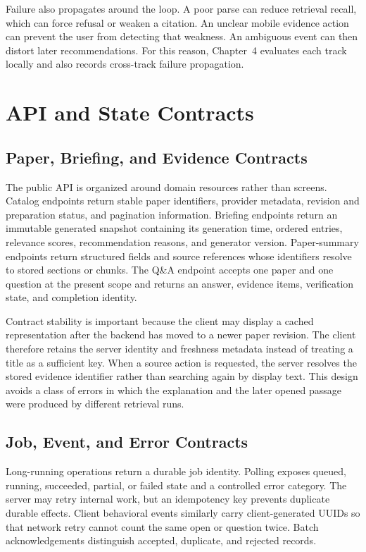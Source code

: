 Failure also propagates around the loop.
A poor parse can reduce retrieval recall, which can force refusal or weaken a citation.
An unclear mobile evidence action can prevent the user from detecting that weakness.
An ambiguous event can then distort later recommendations.
For this reason, Chapter~4 evaluates each track locally and also records cross-track failure propagation.

\section{API and State Contracts}

\subsection{Paper, Briefing, and Evidence Contracts}

The public API is organized around domain resources rather than screens.
Catalog endpoints return stable paper identifiers, provider metadata, revision and preparation status, and pagination information.
Briefing endpoints return an immutable generated snapshot containing its generation time, ordered entries, relevance scores, recommendation reasons, and generator version.
Paper-summary endpoints return structured fields and source references whose identifiers resolve to stored sections or chunks.
The Q\&A endpoint accepts one paper and one question at the present scope and returns an answer, evidence items, verification state, and completion identity.

Contract stability is important because the client may display a cached representation after the backend has moved to a newer paper revision.
The client therefore retains the server identity and freshness metadata instead of treating a title as a sufficient key.
When a source action is requested, the server resolves the stored evidence identifier rather than searching again by display text.
This design avoids a class of errors in which the explanation and the later opened passage were produced by different retrieval runs.

\subsection{Job, Event, and Error Contracts}

Long-running operations return a durable job identity.
Polling exposes queued, running, succeeded, partial, or failed state and a controlled error category.
The server may retry internal work, but an idempotency key prevents duplicate durable effects.
Client behavioral events similarly carry client-generated UUIDs so that network retry cannot count the same open or question twice.
Batch acknowledgements distinguish accepted, duplicate, and rejected records.

